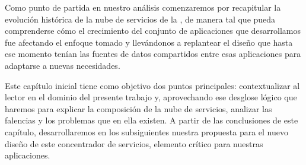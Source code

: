 Como punto de partida en nuestro análisis comenzaremos por recapitular la evolución histórica de la nube de servicios de la {\unlp}, de manera tal que pueda comprenderse cómo el crecimiento del conjunto de aplicaciones que desarrollamos fue afectando el enfoque tomado y llevándonos a replantear el diseño que hasta ese momento tenían las fuentes de datos compartidos entre esas aplicaciones para adaptarse a nuevas necesidades.

Este capítulo inicial tiene como objetivo dos puntos principales: contextualizar al lector en el dominio del presente trabajo y, aprovechando ese desglose lógico que haremos para explicar la composición de la nube de servicios, analizar las falencias y los problemas que en ella existen. A partir de las conclusiones de este capítulo, desarrollaremos en los subsiguientes nuestra propuesta para el nuevo diseño de este concentrador de servicios, elemento crítico para nuestras aplicaciones.
